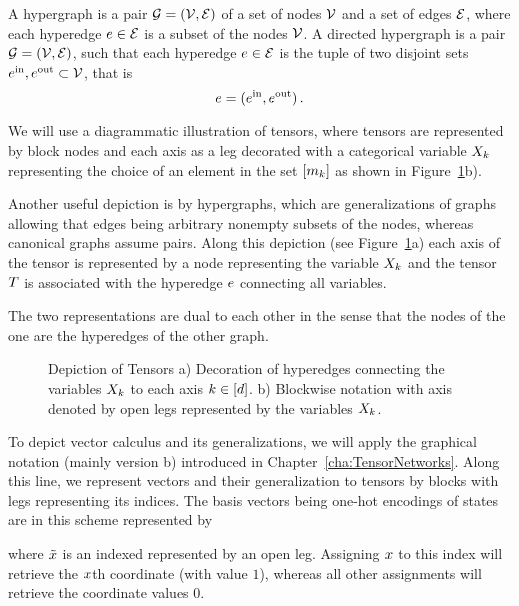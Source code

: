 \begin{definition}\label{def:hypergraphs}
	A hypergraph is a pair $\mathcal{G}=(\mathcal{V},\mathcal{E})$ of a set of nodes $\mathcal{V}$ and a set of edges $\mathcal{E}$, where each hyperedge $e\in\mathcal{E}$ is a subset of the nodes $\mathcal{V}$.
	A directed hypergraph is a pair $\mathcal{G}=(\mathcal{V},\mathcal{E})$, such that each hyperedge $e\in\mathcal{E}$ is the tuple of two disjoint sets $e^{\mathrm{in}},e^{\mathrm{out}}\subset\mathcal{V}$, that is
		\[ e = (e^{\mathrm{in}},e^{\mathrm{out}})  \, . \]
\end{definition}


We will use a diagrammatic illustration of tensors, where tensors are represented by block nodes and each axis as a leg decorated with a categorical variable $X_{k}$ representing the choice of an element in the set $[m_{k}]$ as shown in Figure~\ref{fig:tensors}b).

Another useful depiction is by hypergraphs, which are generalizations of graphs allowing that edges being arbitrary nonempty subsets of the nodes, whereas canonical graphs assume pairs.
Along this depiction (see Figure~\ref{fig:tensors}a) each axis of the tensor is represented by a node representing the variable $X_{k}$ and the tensor $T$ is associated with the hyperedge $e$ connecting all variables.

The two representations are dual to each other in the sense that the nodes of the one are the hyperedges of the other graph.

\begin{figure}[h!]
	\begin{center}
		
	\end{center}
	\caption{Depiction of Tensors 
	a) Decoration of hyperedges connecting the variables $X_{k}$ to each axis $k\in[d]$.
	b) Blockwise notation with axis denoted by open legs represented by the variables $X_{k}$.
	}\label{fig:tensors}
\end{figure}


To depict vector calculus and its generalizations, we will apply the graphical notation (mainly version b) introduced in Chapter~\ref{cha:TensorNetworks}. 
Along this line, we represent vectors and their generalization to tensors by blocks with legs representing its indices.
The basis vectors being one-hot encodings of states are in this scheme represented by
	\begin{center}
		
	\end{center}
where $\tilde{x}$ is an indexed represented by an open leg. 
Assigning $x$ to this index will retrieve the $x$th coordinate (with value $1$), whereas all other assignments will retrieve the coordinate values $0$. 

